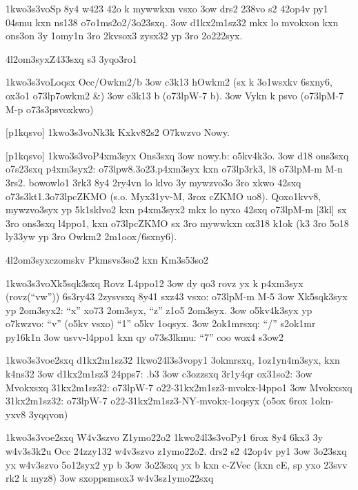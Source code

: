   \p1kwo3s3vo{Sp 8y4 w423 42o k mywwkxn vsxo}
  \s3ow drs2 238vo s2 42op4v py1 04smu kxn ns138 o7o1ms2o2/3o23sxq.
  \s3ow d1kx2m1sz32 mkx lo mvokxon kxn ons3on 3y 1omy1n 3ro 2kvsox3
    zysx32 yp 3ro 2o222syx.

\24l2om3syx{Z433sxq s3 3yqo3ro1}

  \p1kwo3s3vo{Loqsx Occ/Owkm2/b}
  \s3ow c3k13 hOwkm2  (sx k 3o1wsxkv 6sxny6, ox3o1 \3o73lp{7owkm2 \&})
  \s3ow c3k13 b (\3o73lp{W-7 b}).
  \s3ow Vykn k psvo (\3o73lp{M-7 M-p} \3o73s3{psvoxkwo})

[p1kqsvo]
  \p1kwo3s3vo{Nk3k Kxkv82s2 O7kwzvo}
  Nowy.

[p1kqsvo] \p1kwo3s3vo{P4xm3syx Ons3sxq}
  \s3ow nowy.b: o5kv4k3o.
  \s3ow d18 ons3sxq o7s23sxq p4xm3syx2: \3o73lp{w8.3o23.p4xm3syx} kxn
    \3o73lp{3rk3}, l8 \3o73lp{M-m M-n 3rs2}.  bowowlo1 3rk3 8y4 2ry4vn
    lo klvo 3y mywzvo3o 3ro xkwo 42sxq \3o73s3{kt1.3}\3o73lp{cZKMO}
    (s.o.  Myx31yv-M, 3rox cZKMO uo8).  Qoxo1kvv8, mywzvo3syx yp
    5k1sklvo2 kxn p4xm3syx2 mkx lo nyxo 42sxq \3o73lp{M-m [3kl]} sx 3ro
    ons3sxq l4ppo1, kxn \3o73lp{cZKMO} sx 3ro mywwkxn ox318 k1ok (k3
    3ro 5o18 ly33yw yp 3ro Owkm2 2m1oox/6sxny6).

\24l2om3syx{czomskv Pkmsvs3so2 kxn Km3s53so2}

  \p1kwo3s3vo{Xk5sqk3sxq Rovz L4ppo12}
  \s3ow dy qo3 rovz yx k p4xm3syx (rovz(``vw'')) 6s3ry43
    2zysvsxq 8y41 sxz43 vsxo:  \3o73lp{M-m M-5}
  \s3ow Xk5sqk3syx yp 2om3syx2: ``x'' xo73 2om3syx, ``z'' z1o5 2om3syx.
  \s3ow o5kv4k3syx yp o7kwzvo: ``v'' (o5kv vsxo) ``1'' o5kv 1oqsyx.
  \s3ow 2ok1mrsxq: ``/'' s2ok1mr py16k1n
  \s3ow usvv-l4ppo1 kxn qy \3o73s3{lkmu}: ``7''
  coo wox4 s3ow2

  \p1kwo3s3vo{e2sxq d1kx2m1sz32}
  \p1kwo24l3s3vo{py1 3okmrsxq, 1oz1yn4m3syx, kxn k4ns32}
  \s3ow d1kx2m1sz3 24pps7:  .b3
  \s3ow c3ozzsxq 3r1y4qr ox31so2:
  \s3ow Mvokxsxq 31kx2m1sz32: \3o73lp{W-7 o22-31kx2m1sz3-mvokx-l4ppo1}
  \s3ow Mvokxsxq 31kx2m1sz32: \3o73lp{W-7 o22-31kx2m1sz3-NY-mvokx-1oqsyx} (o5ox 6rox 1okn-yxv8 3yqqvon)

  \p1kwo3s3vo{e2sxq W4v3szvo Z1ymo22o2}
  \p1kwo24l3s3vo{Py1 6rox 8y4 6kx3 3y w4v3s3k2u}
  Occ 24zzy132 w4v3szvo z1ymo22o2.   drs2 s2 42op4v py1 
  \s3ow 3o23sxq yx w4v3szvo 5o12syx2 yp b
  \s3ow 3o23sxq yx b kxn c-ZVec (kxn cE, sp yxo 23svv rk2 k myz8)
  \s3ow sxoppsmsox3 w4v3sz1ymo22sxq

